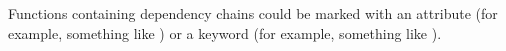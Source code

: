 Functions containing dependency chains could be marked with
an attribute (for example, something like
) or
a keyword (for example, something like
).
